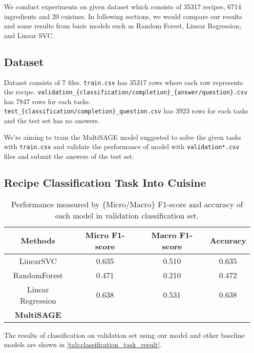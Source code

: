 

 We conduct experiments on given dataset which consists of 35317 recipes, 6714 ingredients and 20 cuisines. In following sections, we would compare our results and some results from basic models such as Random Forest, Linear Regression, and Linear SVC.
 
 \subsection{Dataset}
 Dataset consists of 7 files. \texttt{train.csv} has 35317 rows where each row represents the recipe. \texttt{validation\_\texttt{\{classification/completion\}}\_\texttt{\{answer/question\}}.csv} has 7847 rows for each tasks. \texttt{test\_\texttt{\{classification/completion\}}\_question.csv} has 3923 rows for each tasks and the test set has no answers.  
 
  We're aiming to train the MultiSAGE model suggested to solve the given tasks with \texttt{train.csv} and validate the performance of model with \texttt{validation*.csv} files and submit the answers of the test set. 
 \subsection{Recipe Classification Task Into Cuisine}
 
 \begin{table}[btp!]
    \centering
    \begin{tabular}{ c c c c }
        \toprule
        \textbf{Methods} & \textbf{Micro F1-score} & \textbf{Macro F1-score} & \textbf{Accuracy} \\
        \midrule
        LinearSVC & 0.635 & 0.510 & 0.635 \\
        RandomForest & 0.471 & 0.210 & 0.472 \\
        Linear Regression & 0.638 & 0.531 & 0.638 \\
        \textbf{MultiSAGE} & & & \\
        \bottomrule
        
    \end{tabular}
    \caption{\label{tab:classification_task_result} Performance measured by \{Micro/Macro\} F1-score and accuracy of each model in validation classification set.}

 \end{table}
 
  The results of classification on validation set using our model and other baseline models are shown in \autoref{tab:classification_task_result}.  
  
